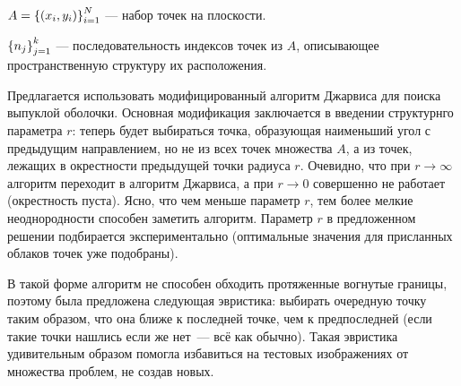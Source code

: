 






 $A = \left\{\left(x_i, y_i\right)\right\}_{i=1}^N$ --- набор точек на плоскости.

 $\left\{n_j\right\}_{j=1}^k$ --- последовательность индексов точек из $A$, описывающее пространственную структуру их расположения.

Предлагается использовать модифицированный алгоритм Джарвиса для поиска выпуклой оболочки. 
Основная модификация заключается в введении структурнго параметра  $r$: теперь будет выбираться точка, образующая наименьший угол с предыдущим направлением, но не из всех точек множества $A$, а из точек, лежащих в окрестности предыдущей точки радиуса $r$. 
Очевидно, что при $r\to\infty$ алгоритм переходит в алгоритм Джарвиса, а при $r\to0$ совершенно не работает (окрестность пуста). 
Ясно, что чем меньше параметр $r$, тем более мелкие неоднородности способен заметить алгоритм.
Параметр $r$ в предложенном решении подбирается экспериментально (оптимальные значения для присланных облаков точек уже подобраны).

В такой форме алгоритм не способен обходить протяженные вогнутые границы, поэтому была предложена следующая эвристика: выбирать очередную точку таким образом, что она ближе к последней точке, чем к предпоследней (если такие точки нашлись если же нет~--- всё как обычно). 
Такая эвристика удивительным образом помогла избавиться на тестовых изображениях от множества проблем, не создав новых.


